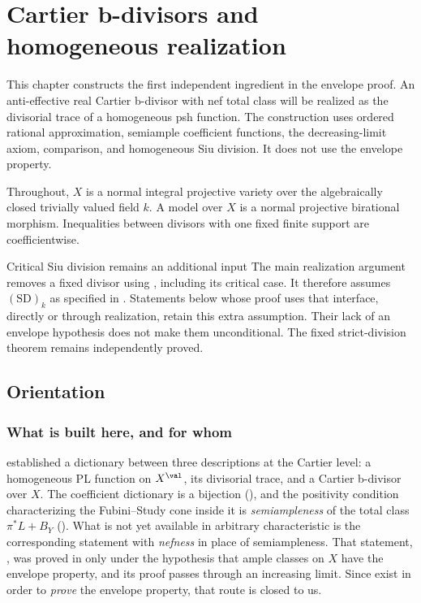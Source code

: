 \chapter{Cartier b-divisors and homogeneous realization}
\label{chap:bj-cartier-realization}

This chapter constructs the first independent ingredient in the envelope
proof.  An anti-effective real Cartier b-divisor with nef total class will
be realized as the divisorial trace of a homogeneous psh function.  The
construction uses ordered rational approximation, semiample coefficient
functions, the decreasing-limit axiom, comparison, and homogeneous Siu
division.  It does not use the envelope property.

Throughout, $X$ is a normal integral projective variety over the
algebraically closed trivially valued field $k$.  A model over $X$ is a
normal projective birational morphism.  Inequalities between divisors with
one fixed finite support are coefficientwise.

\begin{warning}{Critical Siu division remains an additional input}
\label{warn:ch38-siu-dependency}
The main realization argument removes a fixed divisor using
, including its critical case.
It therefore assumes $\mathrm{(SD)}_k$ as specified in
. Statements below whose proof uses that
interface, directly or through realization, retain this extra assumption.
Their lack of an envelope hypothesis does not make them unconditional.
The fixed strict-division theorem remains independently proved.
\end{warning}

\section{Orientation}
\label{sec:ch38-orientation}

\subsection{What is built here, and for whom}
\label{sec:ch38-what}

 established a dictionary between three
descriptions at the Cartier level: a homogeneous PL function on
$X^{\val}$, its divisorial trace, and a Cartier b-divisor over $X$.
The coefficient dictionary is a bijection
(), and the positivity condition
characterizing the Fubini--Study cone inside it is
\emph{semiampleness} of the total class $\pi^*L+B_Y$
().  What is not yet available in
arbitrary characteristic is the corresponding statement with
\emph{nefness} in place of semiampleness.  That statement,
, was proved in
 only under the hypothesis that ample
classes on $X$ have the envelope property, and its proof passes through
an increasing limit.  Since
exist in order to \emph{prove} the envelope property, that route is closed
to us.

